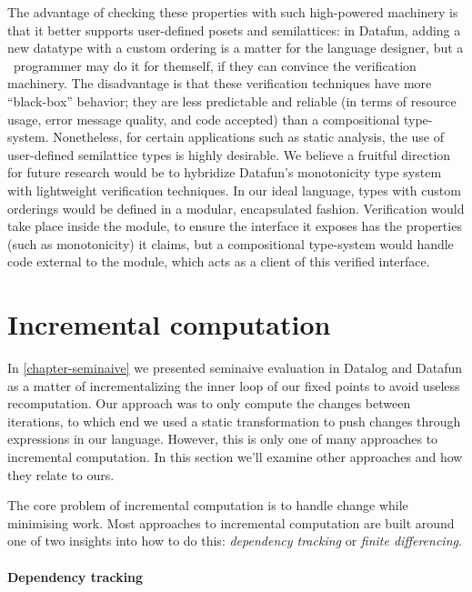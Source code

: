 The advantage of checking these properties with such high-powered machinery is
that it better supports user-defined posets and semilattices: in Datafun, adding
a new datatype with a custom ordering is a matter for the language designer, but
a \flix\ programmer may do it for themself, if they can convince the verification machinery.
%
The disadvantage is that these verification techniques have more ``black-box'' behavior; they are less predictable and reliable (in terms of resource usage, error message quality, and code accepted) than a compositional type-system.
%
Nonetheless, for certain applications such as static analysis, the use of user-defined semilattice types is highly desirable.
%
We believe a fruitful direction for future research would be to hybridize Datafun's monotonicity type system with lightweight verification techniques. In our ideal language, types with custom orderings would be defined in a modular, encapsulated fashion. Verification would take place inside the module, to ensure the interface it exposes has the properties (such as monotonicity) it claims, but a compositional type-system would handle code external to the module, which acts as a client of this verified interface.



\section{Incremental computation}

In \cref{chapter-seminaive} we presented seminaive evaluation in Datalog and
Datafun as a matter of incrementalizing the inner loop of our fixed points to
avoid useless recomputation. Our approach was to only compute the changes
between iterations, to which end we used a static transformation to push changes
through expressions in our language.
%
However, this is only one of many approaches to incremental computation.
%
In this section we'll examine other approaches and how they relate to ours.

The core problem of incremental computation is to handle change while minimising work.
%
Most approaches to incremental computation are built around one of two insights
into how to do this: \emph{dependency tracking} or \emph{finite differencing}.

\paragraph{Dependency tracking}

